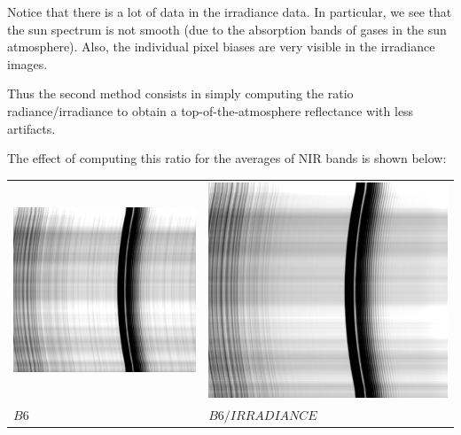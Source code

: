 \documentclass[a4paper]{article}    %
\theoremstyle{note}
\theoremstyle{plain}
\begin{document}
Notice that there is a lot of data in the irradiance data.  In particular,
we see that the sun spectrum is not smooth (due to the absorption bands of
gases in the sun atmosphere).  Also, the individual pixel biases are very
visible in the irradiance images.

Thus the second method consists in simply computing the ratio
radiance/irradiance to obtain a top-of-the-atmosphere reflectance with less
artifacts.

\clearpage
The effect of computing this ratio for the averages of NIR bands is shown
below:

\begin{tabular}{ll}
	\includegraphics[width=0.48\linewidth]{f/b6_avgs_original.png} &
	\includegraphics[width=0.48\linewidth]{f/b6_avgs_irradiance_corrected.png} \\
	$B6$ &
	$B6/IRRADIANCE$ \\
\end{tabular}
\end{document}
